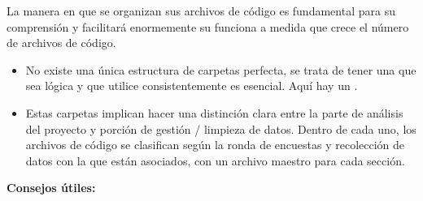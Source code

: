 \documentclass[11pt,en]{elegantpaper}
\begin{document}
La manera en que se organizan sus archivos de código es fundamental para su comprensión y facilitará enormemente su
funciona a medida que crece el número de archivos de código.

	\begin{itemize}
		\item No existe una única estructura de carpetas perfecta, se trata de tener una que sea lógica y que utilice 		                               consistentemente es esencial. Aquí hay un .
		\item Estas carpetas implican hacer una distinción clara entre la parte de análisis del proyecto y porción de gestión / 		      limpieza de datos. Dentro de cada uno, los archivos de código se clasifican según la ronda de 			      		       encuestas y recolección de datos con la que están asociados, con un archivo maestro para cada sección.
	\end{itemize}

\textbf{Consejos útiles:}
\end{document}

